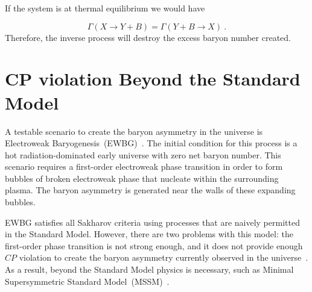 If the system is at thermal equilibrium we would have

\begin{equation}
\Gamma(X \rightarrow Y + B) = \Gamma(Y + B \rightarrow X)~.
\end{equation}
Therefore, the inverse process will destroy the excess baryon number
created.



\section{CP violation Beyond the Standard Model}
A testable scenario to create the baryon asymmetry in the universe is
Electroweak Baryogenesis~(EWBG)~\cite{Morrissey2012}. The initial
condition for this process is a hot radiation-dominated early universe
with zero net baryon number. This scenario requires a first-order
electroweak phase transition in order to form bubbles of broken
electroweak phase that nucleate within the surrounding plasma. The
baryon asymmetry is generated near the walls of these expanding
bubbles.

EWBG satisfies all Sakharov criteria using processes that are naively
permitted in the Standard Model. However, there are two problems with
this model: the first-order phase transition is not strong enough, and
it does not provide enough $CP$ violation to create the baryon
asymmetry currently observed in the universe~\cite{Cline2017}. As a
result, beyond the Standard Model physics is necessary, such as
Minimal Supersymmetric Standard Model~(MSSM)~\cite{Carena1996}.

